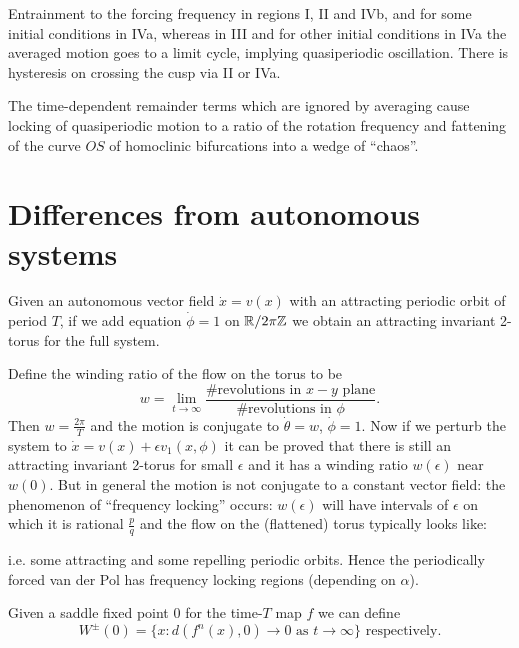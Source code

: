 \documentclass{notes}
\theoremstyle{plain}
\begin{document}
Entrainment to the forcing frequency in regions I, II and IVb, and for
some initial conditions in IVa, whereas in III and for other initial
conditions in IVa the averaged motion goes to a limit cycle, implying
quasiperiodic oscillation.  There is hysteresis on crossing the cusp via
II or IVa.

The time-dependent remainder terms which are ignored by averaging cause locking
of quasiperiodic motion to a ratio of the rotation frequency and fattening
of the curve $OS$ of homoclinic bifurcations into a wedge of ``chaos''.

\section{Differences from autonomous systems}

Given an autonomous vector field $\dot{x} = v(x)$ with an attracting
periodic orbit of period $T$, if we add equation $\dot{\phi}=1$ on
$\mathbb{R}/2 \pi \mathbb{Z}$ we obtain an attracting invariant 2-torus for the full system.

\vspace*{1.5in}

Define the winding ratio of the flow on the torus to be
\[
w = \lim_{t \to \infty} \frac{\text{\# revolutions in $x-y$ plane}}{
\text{\# revolutions in $\phi$}}.
\]
Then $w = \frac{2 \pi}{T}$ and the motion is conjugate to $\dot{\theta} = w$,
$\dot{\phi} = 1$.  Now if we perturb the system to $\dot{x} = v(x) 
+ \epsilon v_1(x,\phi)$ it can be proved that there is still an attracting
invariant 2-torus for small $\epsilon$ and it has a winding ratio
$w(\epsilon)$ near $w(0)$.  But in general the motion is not conjugate to
a constant vector field: the phenomenon of ``frequency locking'' occurs:
$w(\epsilon)$ will have intervals of $\epsilon$ on which it is
rational $\frac{p}{q}$ and the flow on the (flattened) torus typically
looks like:

\vspace{1.5in}

\begin{flushright}
\parbox{2in}{%
i.e. some attracting and some repelling periodic orbits.  Hence the
periodically forced van der Pol has frequency locking regions
(depending on $\alpha$).}
\end{flushright}

Given a saddle fixed point $0$ for the time-$T$ map $f$ we can define
\[
W^\pm(0) = \{ x : d(f^n(x),0) \to 0 \text{ as } t \to \infty\}
\text{ respectively.}
\]
\end{document}
